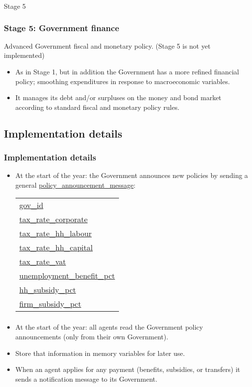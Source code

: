 \documentclass{beamer}
\begin{document}
\begin{frame}{Stage 5}
\frametitle{Stage 5: Government finance}
Advanced Government fiscal and monetary policy.
(Stage 5 is not yet implemented)
\begin{itemize}
\item As in Stage 1, but in addition the Government has a more refined financial policy; smoothing expenditures in response to macroeconomic variables.
\item It manages its debt and/or surpluses on the money and bond market according
to standard fiscal and monetary  policy rules.
\end{itemize}
\end{frame}

\subsection{Implementation details}
\begin{frame}{}
\frametitle{Implementation details}
\begin{itemize}
\item At the start of the year: the Government announces new policies by
sending a general \url{policy_announcement_message}:
\begin{tabular}{l}
\url{gov_id}\\
\url{tax_rate_corporate}\\
\url{tax_rate_hh_labour}\\
\url{tax_rate_hh_capital}\\
\url{tax_rate_vat}\\
\url{unemployment_benefit_pct}\\
\url{hh_subsidy_pct}\\
\url{firm_subsidy_pct}
\end{tabular}
\end{itemize}
\end{frame}

\begin{frame}{}
\frametitle{}
\begin{itemize}
\item At the start of the year: all agents read the Government policy
announcements (only from their own Government).
\item Store that information in memory variables for later use.
\item When an agent applies for any payment (benefits, subsidies, or transfers) it sends a notification message to its
Government.
\end{itemize}
\end{frame}
\end{document}
